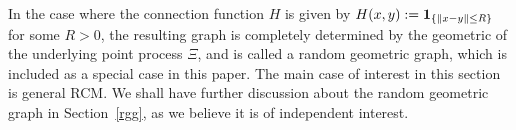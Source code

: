 \documentclass[bj,authoryear,noshowframe]{imsart}
\theoremstyle{plain}
\theoremstyle{remark}
\newcommand{\R}{\mathbb{R}}
\newcommand{\bone}{{\bf 1}}
\begin{document}
 
  In the case where the connection function $H$ is given by $H(x,y) := \bone_{\{\|x-y\|\leq R\}}$ for some $R>0$, the resulting graph is completely determined by the geometric of the underlying point process $\Xi$, and is called a random geometric graph,
  which is included as a special case in this paper. The main case of interest in this section is general RCM. We shall have further discussion about the random geometric graph in Section~\ref{rgg}, as we believe it is of independent interest. 
 
 
\end{document}
